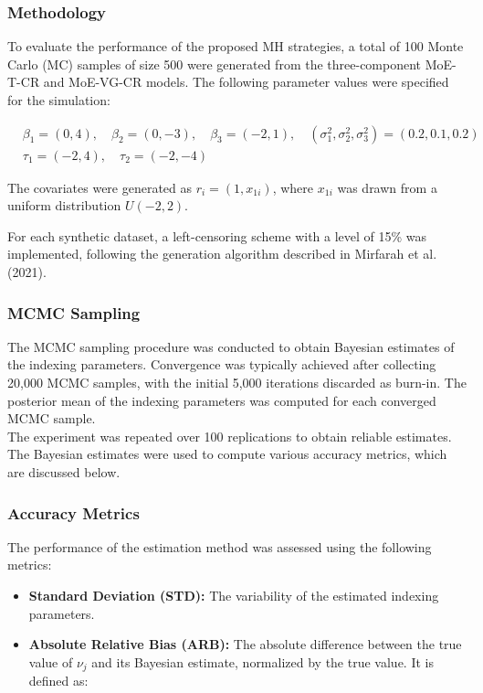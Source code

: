 \documentclass[10.5pt]{article} %
\begin{document}
\subsubsection{Methodology}
To evaluate the performance of the proposed MH strategies, a total of 100 Monte Carlo (MC) samples of size 500 were generated from the three-component MoE-T-CR and MoE-VG-CR models. The following parameter values were specified for the simulation:

\[
\begin{aligned}
    &\beta_1 = (0, 4), \quad \beta_2 = (0, -3), \quad \beta_3 = (-2, 1), \quad (\sigma_1^2, \sigma_2^2, \sigma_3^2) = (0.2, 0.1, 0.2) \\
    &\tau_1 = (-2, 4), \quad \tau_2 = (-2, -4)
\end{aligned}
\]

\noindent
The covariates were generated as \( r_i = (1, x_{1i}) \), where \( x_{1i} \) was drawn from a uniform distribution \( U(-2, 2) \).

\noindent
For each synthetic dataset, a left-censoring scheme with a level of 15\% was implemented, following the generation algorithm described in Mirfarah et al. (2021).

\subsubsection{MCMC Sampling}
The MCMC sampling procedure was conducted to obtain Bayesian estimates of the indexing parameters. Convergence was typically achieved after collecting 20,000 MCMC samples, with the initial 5,000 iterations discarded as burn-in. The posterior mean of the indexing parameters was computed for each converged MCMC sample.\\
\noindent
The experiment was repeated over 100 replications to obtain reliable estimates. The Bayesian estimates were used to compute various accuracy metrics, which are discussed below.

\subsubsection{Accuracy Metrics}
The performance of the estimation method was assessed using the following metrics:

\begin{itemize}
    \item \textbf{Standard Deviation (STD):} The variability of the estimated indexing parameters.
    \item \textbf{Absolute Relative Bias (ARB):} The absolute difference between the true value of \( \nu_j \) and its Bayesian estimate, normalized by the true value. It is defined as:
\end{itemize}
\end{document}
